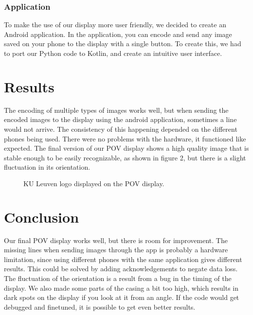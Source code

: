 \documentclass[10pt,twocolumn,letterpaper]{article}
\begin{document}
\subsubsection{Application}
To make the use of our display more user friendly, we decided to create an Android application. 
In the application, you can encode and send any image saved on your phone to the display with a single button.
To create this, we had to port our Python code to Kotlin, and create an intuitive user interface.

\section{Results}
The encoding of multiple types of images works well, but when sending the encoded images to the display using the android application, sometimes a line would not arrive.
The consistency of this happening depended on the different phones being used.
There were no problems with the hardware, it functioned like expected.
The final version of our POV display shows a high quality image that is stable enough to be easily recognizable, as shown in figure 2, but there is a slight fluctuation in its orientation. 
\begin{figure}
\begin{center}
\end{center}
   \caption{KU Leuven logo displayed on the POV display.}
\label{fig:short}
\end{figure}
\section{Conclusion}

Our final POV display works well, but there is room for improvement. 
The missing lines when sending images through the app is probably a hardware limitation, since using different phones with the same application gives different results.
This could be solved by adding acknowledgements to negate data loss.
The fluctuation of the orientation is a result from a bug in the timing of the display. 
We also made some parts of the casing a bit too high, which results in dark spots on the display if you look at it from an angle.
If the code would get debugged and finetuned, it is possible to get even better results.

{\small


}
\end{document}
